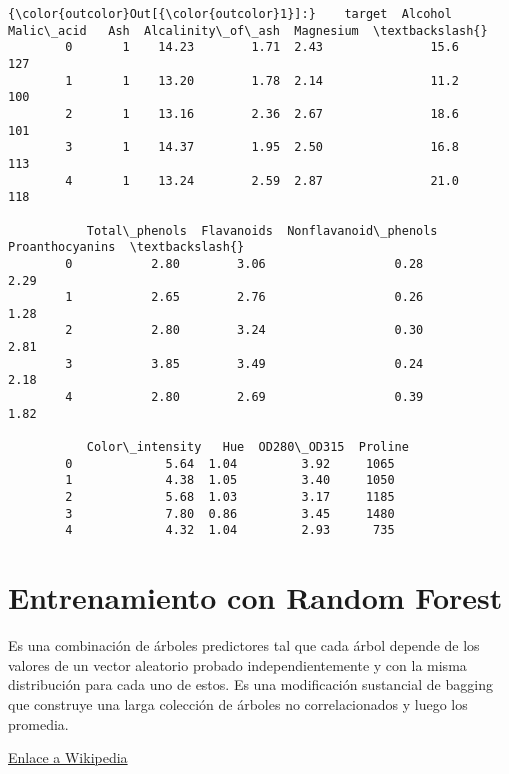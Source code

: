 \documentclass[11pt]{article}
\begin{document}
\begin{Verbatim}[commandchars=\\\{\}]
{\color{outcolor}Out[{\color{outcolor}1}]:}    target  Alcohol  Malic\_acid   Ash  Alcalinity\_of\_ash  Magnesium  \textbackslash{}
        0       1    14.23        1.71  2.43               15.6        127   
        1       1    13.20        1.78  2.14               11.2        100   
        2       1    13.16        2.36  2.67               18.6        101   
        3       1    14.37        1.95  2.50               16.8        113   
        4       1    13.24        2.59  2.87               21.0        118   
        
           Total\_phenols  Flavanoids  Nonflavanoid\_phenols  Proanthocyanins  \textbackslash{}
        0           2.80        3.06                  0.28             2.29   
        1           2.65        2.76                  0.26             1.28   
        2           2.80        3.24                  0.30             2.81   
        3           3.85        3.49                  0.24             2.18   
        4           2.80        2.69                  0.39             1.82   
        
           Color\_intensity   Hue  OD280\_OD315  Proline  
        0             5.64  1.04         3.92     1065  
        1             4.38  1.05         3.40     1050  
        2             5.68  1.03         3.17     1185  
        3             7.80  0.86         3.45     1480  
        4             4.32  1.04         2.93      735  
\end{Verbatim}
            
    \section{Entrenamiento con Random
Forest}\label{entrenamiento-con-random-forest}

Es una combinación de árboles predictores tal que cada árbol depende de
los valores de un vector aleatorio probado independientemente y con la
misma distribución para cada uno de estos. Es una modificación
sustancial de bagging que construye una larga colección de árboles no
correlacionados y luego los promedia.

\href{https://es.wikipedia.org/wiki/Random_forest}{Enlace a Wikipedia}
\end{document}
